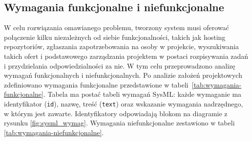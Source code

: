\subsection{Wymagania funkcjonalne i niefunkcjonalne}
W celu rozwiązania omawianego problemu, tworzony system musi oferować połączenie kilku niezależnych od siebie funkcjonalności, takich jak hosting repozytoriów,
zgłaszania zapotrzebowania na osoby w projekcie, wyszukiwania takich ofert i podstawowego zarządzania projektem w postaci rozpisywania zadań i przydzielania odpowiedzialności za nie.
W tym celu przeprowadzono analizę wymagań funkcjonalnych i niefunkcjonalnych. Po analizie założeń projektowych zdefiniowano wymagania funkcjonalne przedstawione w tabeli~\ref{tab:wymagania-funkcjonalne}.
Tabela ma postać tabeli wymagań SysML: każde wymaganie ma identyfikator (\texttt{id}), nazwę, treść (\texttt{text}) oraz wskazanie wymagania nadrzędnego, w którym jest zawarte.
Identyfikatory odpowiadają blokom na diagramie z rysunku \ref{fig:sysml_wymag}. Wymagania niefunkcjonalne zestawiono w tabeli \ref{tab:wymagania-niefunkcjonalne}.
